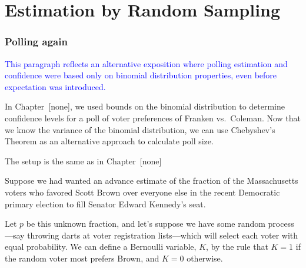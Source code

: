 
\section{Estimation by Random Sampling}


\subsubsection{Polling again}
\begin{editingnotes}

\textcolor{blue}{This paragraph reflects an alternative exposition
  where polling estimation and confidence were based only on binomial
  distribution properties, even before expectation was introduced.}

In Chapter~[none], we used bounds on the binomial distribution to determine
confidence levels for a poll of voter preferences of Franken vs.\ Coleman.
Now that we know the variance of the binomial distribution, we can use
Chebyshev's Theorem as an alternative approach to calculate poll size.

The setup is the same as in Chapter~[none]
\end{editingnotes}

Suppose we had wanted an advance estimate of the fraction of the
Massachusetts voters who favored Scott Brown over everyone else in the
recent Democratic primary election to fill Senator Edward Kennedy's seat.

\iffalse
\footnote{We can only keep our fingers crossed for this race to
  happen---when they ran against each other for the U.S. Senate in
  2000, they generated some of the best entertainment in TV history.}
\fi

Let $p$ be this unknown fraction, and let's suppose we have some random
process---say throwing darts at voter registration lists---which will
select each voter with equal probability.  We can define a Bernoulli
variable, $K$, by the rule that $K=1$ if the random voter most prefers
Brown, and $K=0$ otherwise.


